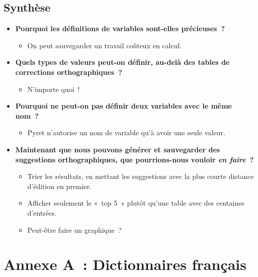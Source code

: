 \documentclass[12pt,a4paper]{article}
\begin{document}
\subsection{Synthèse}

\begin{thinkbox}
  \begin{itemize}
    \item \textbf{Pourquoi les définitions de variables sont-elles précieuses~?}
    \begin{itemize}
      \item On peut sauvegarder un travail coûteux en calcul.
    \end{itemize}
    \item \textbf{Quels types de valeurs peut-on définir, au-delà des tables de corrections orthographiques~?}
    \begin{itemize}
      \item N'importe quoi~!
    \end{itemize}
    \item \textbf{Pourquoi ne peut-on pas définir deux variables avec le même nom~?}
    \begin{itemize}
      \item Pyret n'autorise un nom de variable qu'à avoir une seule valeur.
    \end{itemize}
    \item \textbf{Maintenant que nous pouvons générer et sauvegarder des suggestions orthographiques, que pourrions-nous vouloir \emph{en faire}~?}
    \begin{itemize}
      \item Trier les résultats, en mettant les suggestions avec la plus courte distance d'édition en premier.
      \item Afficher seulement le «~top 5~» plutôt qu'une table avec des centaines d'entrées.
      \item Peut-être faire un graphique~?
    \end{itemize}
  \end{itemize}
\end{thinkbox}

\newpage

\section*{Annexe A~: Dictionnaires français}
\end{document}
